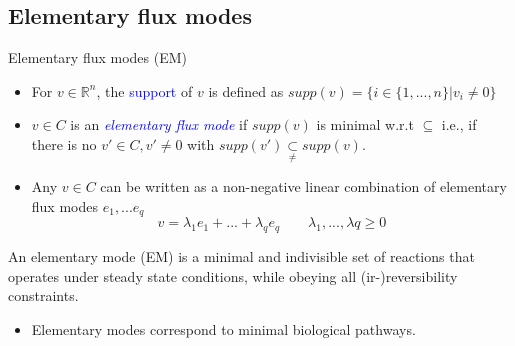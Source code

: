 \documentclass{beamer}
\begin{document}
\subsection{Elementary flux modes}

\begin{frame}{Elementary flux modes (EM)}
    \begin{itemize}
        \item For $v \in \mathbb{R}^n$, the \textcolor{blue}{support}
         of $v$ is defined as 
        $supp(v) = \{i \in \{1, ..., n \} | v_i \neq 0  \}$
        
        \item $v \in C$ is an \emph{\textcolor{blue}{elementary flux mode}} if $supp(v)$
        is minimal w.r.t $\subseteq$
        i.e., if there is no $v' \in C, v' \neq 0$ with 
        $supp(v') \underset{\neq}{\subset} supp(v)$. %
\pause
        \item Any $v \in C$ can be written as a non-negative linear 
        combination of elementary flux modes $e_{1}, ... e_{q}$
        $$v = \lambda_{1} e_{1} + ... + \lambda_{q} e_{q} 
        \quad\quad \lambda_{1}, ..., \lambda{q} \geq 0 $$ %
    \end{itemize}    
\pause
    \begin{block}{}
        An elementary mode (EM) is a minimal and indivisible set 
        of reactions that operates under steady state conditions, 
        while obeying all (ir-)reversibility constraints.
    \end{block}
    
    \begin{itemize}
    	\item Elementary modes correspond to minimal biological pathways.
    \end{itemize}
    
\end{frame}
\end{document}
